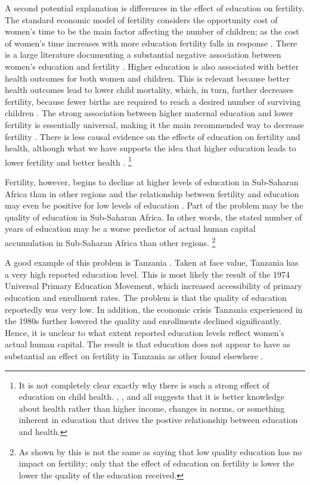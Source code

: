 \documentclass[letterpaper,12pt]{article}
\begin{document}
A second potential explanation is differences in the effect of education 
on fertility. 
The standard economic model of fertility considers the opportunity cost
of women's time to be the main factor affecting the number of children;
as the cost of women's time increases with more education fertility 
falls in response \citep{becker91}. 
There is a large literature documenting a substantial negative association 
between women's education and fertility \citep{strauss95}.
Higher education is also associated with better health outcomes for both 
women and children.
This is relevant because better health outcomes lead to lower child 
mortality, which, in turn, further decreases fertility, because fewer 
births are required to reach a desired number of surviving children 
\citep{Ainsworth1996}. 
The strong association between higher maternal education and lower fertility 
is essentially universal, making it the main recommended way to decrease 
fertility \citep{schultz02}.
There is less causal evidence on the effects of education on fertility
and health, although what we have supports the idea that higher education
leads to lower fertility and better health 
\citep{Breierova2004,Behrman2015,Keats2016,Ozier2016}.%
\footnote{
It is not completely clear exactly why there is such a strong
effect of education on child health.
\citet{Thomas1991}, \citet{Glewwe1999}, and \citet{Kovsted2002}
all suggests that it is better knowledge about health rather 
than higher income, changes in norms, or something inherent in 
education that drives the postive relationship between education
and health.
} 

Fertility, however, begins to decline at higher levels of education in
Sub-Saharan Africa than in other regions and the relationship between
fertility and education may even be positive for low levels of education
\citep{Ainsworth1996,Benefo1996,Thomas1996}. 
Part of the problem may be the quality of education in Sub-Saharan
Africa. 
In other words, the stated number of years of education may be a worse
predictor of actual human capital accumulation in Sub-Saharan Africa
than other regions.%
\footnote{
As shown by \citet{Oye2016} this is not the same as saying that low
quality education has no impact on fertility; only that the effect of
education on fertility is lower the lower the quality of the education
received.}

A good example of this problem is Tanzania
\citep{Galabawa2001,Wedgwood2005}. 
Taken at face value, Tanzania has a very high reported education level. 
This is most likely the result of the 1974 Universal Primary Education
Movement, which increased accessibility of primary education and
enrollment rates. 
The problem is that the quality of education reportedly was very low. 
In addition, the economic crisis Tanzania experienced in the 1980s
further lowered the quality and enrollments declined significantly. 
Hence, it is unclear to what extent reported education levels reflect
women's actual human capital. 
The result is that education does not appear to have as substantial an
effect on fertility in Tanzania as other found elsewhere
\citep{Alam2016}.
\end{document}
